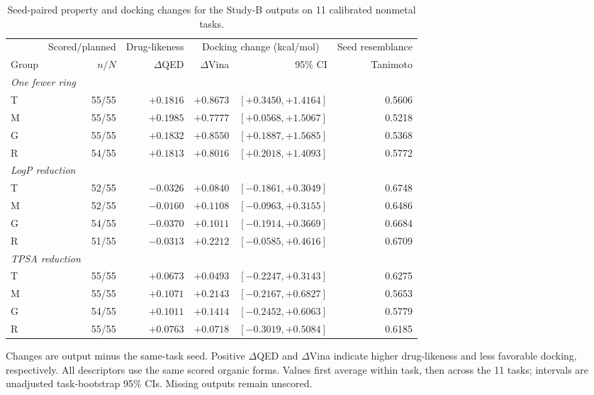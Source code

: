 \begin{table}[!htbp]
\centering\small
\caption{Seed-paired property and docking changes for the Study-B outputs on 11 calibrated nonmetal tasks.}
\label{tab:calibrated_docking}
\setlength{\tabcolsep}{4pt}\renewcommand{\arraystretch}{1.08}
\begin{tabular*}{\linewidth}{@{\extracolsep{\fill}}lrrrrr@{}}
\toprule
 & Scored/planned & Drug-likeness & \multicolumn{2}{c}{Docking change (kcal/mol)} & Seed resemblance \\
\cmidrule(lr){4-5}
Group & $n/N$ & $\Delta$QED & $\Delta$Vina & 95\% CI & Tanimoto \\
\midrule
\multicolumn{6}{l}{\textit{One fewer ring}} \\
T & 55/55 & $+0.1816$ & $+0.8673$ & $[+0.3450, +1.4164]$ & 0.5606 \\
M & 55/55 & $+0.1985$ & $+0.7777$ & $[+0.0568, +1.5067]$ & 0.5218 \\
G & 55/55 & $+0.1832$ & $+0.8550$ & $[+0.1887, +1.5685]$ & 0.5368 \\
R & 54/55 & $+0.1813$ & $+0.8016$ & $[+0.2018, +1.4093]$ & 0.5772 \\
\midrule
\multicolumn{6}{l}{\textit{LogP reduction}} \\
T & 52/55 & $-0.0326$ & $+0.0840$ & $[-0.1861, +0.3049]$ & 0.6748 \\
M & 52/55 & $-0.0160$ & $+0.1108$ & $[-0.0963, +0.3155]$ & 0.6486 \\
G & 54/55 & $-0.0370$ & $+0.1011$ & $[-0.1914, +0.3669]$ & 0.6684 \\
R & 51/55 & $-0.0313$ & $+0.2212$ & $[-0.0585, +0.4616]$ & 0.6709 \\
\midrule
\multicolumn{6}{l}{\textit{TPSA reduction}} \\
T & 55/55 & $+0.0673$ & $+0.0493$ & $[-0.2247, +0.3143]$ & 0.6275 \\
M & 55/55 & $+0.1071$ & $+0.2143$ & $[-0.2167, +0.6827]$ & 0.5653 \\
G & 54/55 & $+0.1011$ & $+0.1414$ & $[-0.2452, +0.6063]$ & 0.5779 \\
R & 55/55 & $+0.0763$ & $+0.0718$ & $[-0.3019, +0.5084]$ & 0.6185 \\
\bottomrule\end{tabular*}
\par\smallskip\begin{minipage}{\linewidth}\footnotesize
Changes are output minus the same-task seed. Positive $\Delta$QED and $\Delta$Vina indicate higher drug-likeness and less favorable docking, respectively. All descriptors use the same scored organic forms. Values first average within task, then across the 11 tasks; intervals are unadjusted task-bootstrap 95\% CIs. Missing outputs remain unscored.
\end{minipage}\end{table}
